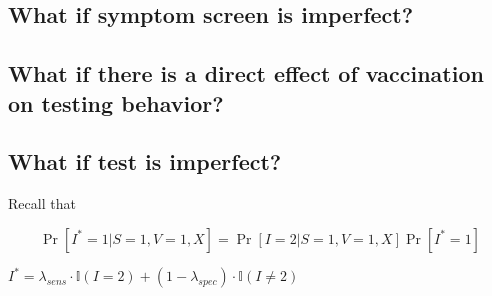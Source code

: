 \begin{appendix}
\subsection{What if symptom screen is imperfect?}

\subsection{What if there is a direct effect of vaccination on testing behavior?}

\subsection{What if test is imperfect?}
Recall that 

$$\Pr[I^* = 1 | S = 1, V = 1, X] = \Pr[I = 2 | S = 1, V = 1, X] \Pr[I^* = 1]$$

$I^* = \lambda_{sens} \cdot \mathbb{I}(I = 2) + (1 - \lambda_{spec}) \cdot \mathbb{I}(I \neq 2)$
\end{appendix}

